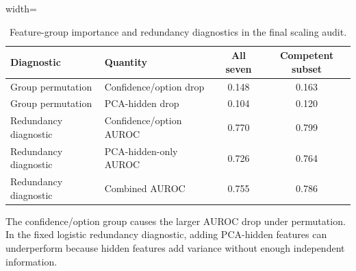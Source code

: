 \begin{table}[t]
\centering
\small
\caption{Feature-group importance and redundancy diagnostics in the final scaling audit.}
\label{tab:importance-redundancy}
\begin{threeparttable}
\begin{adjustbox}{width=\textwidth}
\begin{tabular}{llcc}
\toprule
Diagnostic & Quantity & All seven & Competent subset \\
\midrule
Group permutation & Confidence/option drop & 0.148 & 0.163 \\
Group permutation & PCA-hidden drop & 0.104 & 0.120 \\
Redundancy diagnostic & Confidence/option AUROC & 0.770 & 0.799 \\
Redundancy diagnostic & PCA-hidden-only AUROC & 0.726 & 0.764 \\
Redundancy diagnostic & Combined AUROC & 0.755 & 0.786 \\
\bottomrule
\end{tabular}
\end{adjustbox}

\begin{tablenotes}[flushleft]\footnotesize\item \parbox{0.95\textwidth}{The confidence/option group causes the larger AUROC drop under permutation. In the fixed logistic redundancy diagnostic, adding PCA-hidden features can underperform because hidden features add variance without enough independent information.}\end{tablenotes}
\end{threeparttable}
\end{table}
